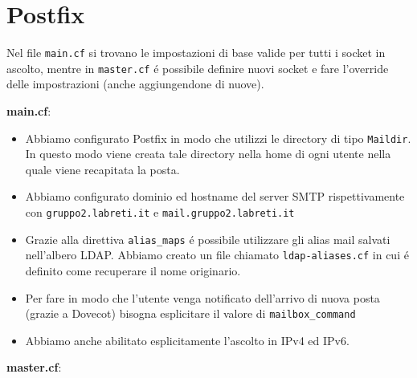 \documentclass[9pt, a4paper, oneside]{article}
\begin{document}
		\section{Postfix}
			\par
				Nel file \texttt{main.cf} si trovano le 
				impostazioni di base valide per tutti i socket 
				in ascolto, mentre in \texttt{master.cf} \'e 
				possibile definire nuovi socket e fare 
				l'override delle impostrazioni (anche 
				aggiungendone di nuove).
			\par
				\textbf{main.cf}:
				\begin{itemize}
					\item
						Abbiamo configurato Postfix in 
						modo che utilizzi le directory 
						di tipo \texttt{Maildir}. In 
						questo modo viene creata tale 
						directory nella home di ogni 
						utente nella quale viene 
						recapitata la posta.
					\item
						Abbiamo configurato dominio ed 
						hostname del server SMTP 
						rispettivamente con 
						\texttt{gruppo2.labreti.it} e 
						\texttt{mail.gruppo2.labreti.it}
					\item
						Grazie alla direttiva 
						\texttt{alias\_maps} 
						\'e possibile 
						utilizzare gli alias 
						mail salvati 
						nell'albero LDAP. Abbiamo 
						creato un file chiamato 
						\texttt{ldap-aliases.cf} in cui 
						\'e definito come recuperare il 
						nome originario.
					\item
						Per fare in modo che l'utente 
						venga notificato dell'arrivo di 
						nuova posta (grazie a Dovecot) 
						bisogna esplicitare il valore 
						di \texttt{mailbox\_command}
					\item
						Abbiamo anche abilitato 
						esplicitamente l'ascolto in 
						IPv4 ed IPv6.
				\end{itemize}
			\par
				\textbf{master.cf}:
\end{document}
